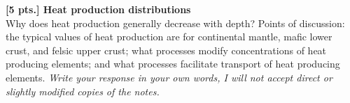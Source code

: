 \item {\bf [5 pts.] Heat production distributions} \\
Why does heat production generally decrease with depth?  Points of discussion:
the typical values of heat production are for continental mantle, mafic lower
crust, and felsic upper crust; what processes modify concentrations of heat
producing elements; and what processes facilitate transport of heat producing
elements. {\it Write your response in your own words, I will not accept direct
or slightly modified copies of the notes.}

